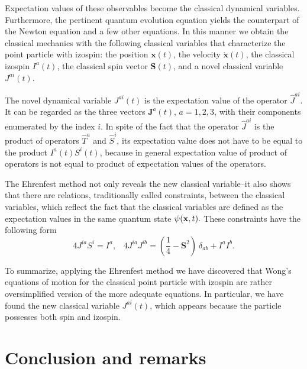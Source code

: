 \documentclass[12pt]{article}
\begin{document}
Expectation values of these observables become the classical dynamical variables. Furthermore, the pertinent quantum evolution equation yields the counterpart of the Newton equation and a few other equations. In this manner we obtain the classical mechanics with the following classical variables that characterize the point particle with izospin: the position $\mathbf{x}(t)$, the velocity $\dot{\mathbf{x}}(t)$, the classical izospin $I^a(t)$, the classical spin vector $\mathbf{S}(t)$, and a novel classical variable 
 $ J^{ai}(t)$. 
 
The novel dynamical variable $J^{ai}(t)$ is the expectation value of the operator $\hat{J}^{ai} $. It can be regarded as the three vectors $\mathbf{J}^a(t)$, $a=1,2,3$, with their components enumerated by the index $i$. In spite of the fact that the operator $\hat{J}^{ai}$ is the product of operators 
$\hat{T}^a$ and $\hat{S}^i$, its expectation value does not have to be equal to the product $I^a(t) S^i(t)$, because in general expectation value of product of operators is not equal to product of expectation values of the operators. 

The Ehrenfest method not only reveals the new classical variable--it also shows that there are relations, traditionally called constraints, between the classical variables, which reflect the fact that the classical variables are defined as the expectation values in the same quantum state $\psi({\bf x}, t).$ These constraints have the following form
\[ 4 J^{i a} S^i = I^a, \;\;\; 4 J^{ia} J^{ib} = (\frac{1}{4} - \mathbf{S}^2) \: \delta_{ab} + I^a I^b. \]




To summarize, applying the Ehrenfest method we have discovered that Wong's equations of motion for the classical point particle with izospin are rather oversimplified version of the more adequate equations. In particular, we have found the new classical variable $J^{ai}(t)$, which appears because the particle possesses both spin and izospin. 








\section{Conclusion and remarks} 
\end{document}
